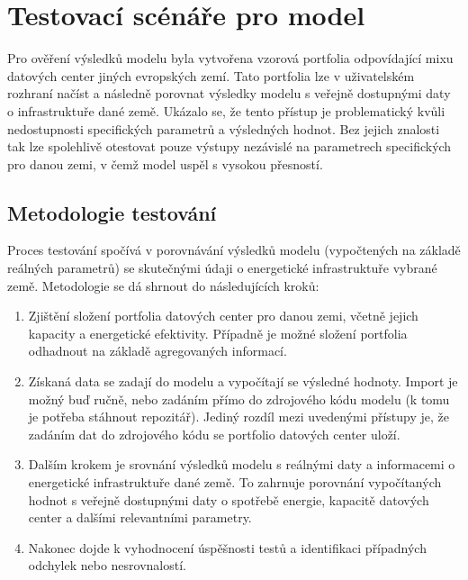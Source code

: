 \chapter{Testovací scénáře pro model}
\label{chap:testovani}

Pro ověření výsledků modelu byla vytvořena vzorová portfolia odpovídající mixu datových center jiných evropských zemí. Tato portfolia lze v uživatelském rozhraní načíst a následně porovnat výsledky modelu s veřejně dostupnými daty o infrastruktuře dané země. Ukázalo se, že tento přístup je problematický kvůli nedostupnosti specifických parametrů a výsledných hodnot. Bez jejich znalosti tak lze spolehlivě otestovat pouze výstupy nezávislé na parametrech specifických pro danou zemi, v čemž model uspěl s vysokou přesností.

\section{Metodologie testování}
\label{sec:testovani_metodika}

Proces testování spočívá v porovnávání výsledků modelu (vypočtených na základě reálných parametrů) se skutečnými údaji o energetické infrastruktuře vybrané země. Metodologie se dá shrnout do následujících kroků:

\begin{enumerate}

    \item Zjištění složení portfolia datových center pro danou zemi, včetně jejich kapacity a energetické efektivity. Případně je možné složení portfolia odhadnout na základě agregovaných informací.
    
    \item Získaná data se zadají do modelu a vypočítají se výsledné hodnoty. Import je možný buď ručně, nebo zadáním přímo do zdrojového kódu modelu (k tomu je potřeba stáhnout repozitář). Jediný rozdíl mezi uvedenými přístupy je, že zadáním dat do zdrojového kódu se portfolio datových center uloží.
    
    \item Dalším krokem je srovnání výsledků modelu s reálnými daty a informacemi o energetické infrastruktuře dané země. To zahrnuje porovnání vypočítaných hodnot s veřejně dostupnými daty o spotřebě energie, kapacitě datových center a dalšími relevantními parametry.
    
    \item Nakonec dojde k vyhodnocení úspěšnosti testů a identifikaci případných odchylek nebo nesrovnalostí.
    
\end{enumerate}

